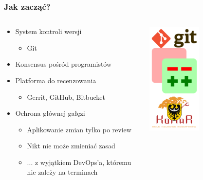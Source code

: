 \documentclass[xcolor=dvipsnames]{beamer}%
\begin{document}
\begin{frame}
	\frametitle{Jak zacząć?}
	\begin{columns}
		\begin{column}{0.5\textwidth}
			\begin{itemize}
				\item System kontroli wersji
				\begin{itemize}
					\item Git
				\end{itemize}
				\item Konsensus pośród programistów
				\item Platforma do recenzowania
				\begin{itemize}
					\item Gerrit, GitHub, Bitbucket
				\end{itemize}
				\item Ochrona głównej gałęzi
				\begin{itemize}
					\item Aplikowanie zmian tylko po review
					\item Nikt nie może zmieniać zasad
					\item ... z wyjątkiem DevOps'a, któremu nie zależy na terminach
				\end{itemize}
			\end{itemize}
		\end{column}
		\begin{column}{0.5\textwidth}
			\begin{center}
				\includegraphics[width=0.5\textwidth,keepaspectratio]{figure/podstawy.png}				
			\end{center}
		\end{column}
	\end{columns}
\end{frame}
\end{document}
